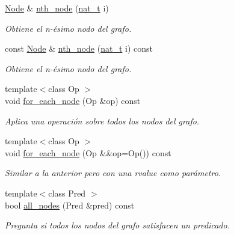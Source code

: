 \begin{DoxyCompactItemize}
\item 
\hyperlink{namespace_designar_a5af326c65aa2bd26b26c410f2030d09e}{Node} \& \hyperlink{class_designar_1_1_base_graph_ae4b7d560477f0b860d127a6ace6956e5}{nth\+\_\+node} (\hyperlink{namespace_designar_aa72662848b9f4815e7bf31a7cf3e33d1}{nat\+\_\+t} i)
\begin{DoxyCompactList}\small\item\em Obtiene el n-\/ésimo nodo del grafo. \end{DoxyCompactList}\item 
const \hyperlink{namespace_designar_a5af326c65aa2bd26b26c410f2030d09e}{Node} \& \hyperlink{class_designar_1_1_base_graph_adc03e916cb6246c9eeba181df82fd149}{nth\+\_\+node} (\hyperlink{namespace_designar_aa72662848b9f4815e7bf31a7cf3e33d1}{nat\+\_\+t} i) const
\begin{DoxyCompactList}\small\item\em Obtiene el n-\/ésimo nodo del grafo. \end{DoxyCompactList}\item 
{\footnotesize template$<$class Op $>$ }\\void \hyperlink{class_designar_1_1_base_graph_a9497531ac221edb5c5ef19888f78ad3c}{for\+\_\+each\+\_\+node} (Op \&op) const
\begin{DoxyCompactList}\small\item\em Aplica una operación sobre todos los nodos del grafo. \end{DoxyCompactList}\item 
{\footnotesize template$<$class Op $>$ }\\void \hyperlink{class_designar_1_1_base_graph_aab8f765719514803f426b03939f519a1}{for\+\_\+each\+\_\+node} (Op \&\&op=Op()) const
\begin{DoxyCompactList}\small\item\em Similar a la anterior pero con una rvalue como parámetro. \end{DoxyCompactList}\item 
{\footnotesize template$<$class Pred $>$ }\\bool \hyperlink{class_designar_1_1_base_graph_abad9513273c1096aba652e211180061c}{all\+\_\+nodes} (Pred \&pred) const
\begin{DoxyCompactList}\small\item\em Pregunta si todos los nodos del grafo satisfacen un predicado. \end{DoxyCompactList}\item 

\end{DoxyCompactItemize}

